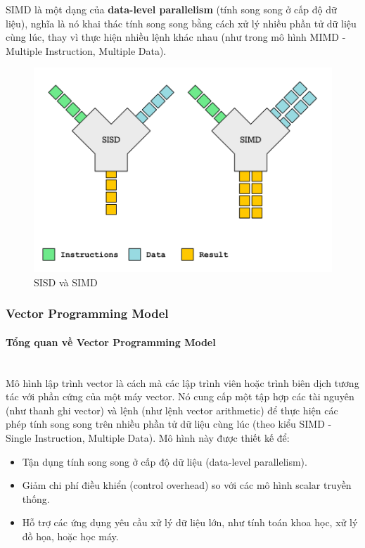 \documentclass[a4paper]{article}
\begin{document}

SIMD là một dạng của \textbf{data-level parallelism} (tính song song ở cấp độ dữ liệu), nghĩa là nó khai thác tính song song bằng cách xử lý nhiều phần tử dữ liệu cùng lúc, thay vì thực hiện nhiều lệnh khác nhau (như trong mô hình MIMD - Multiple Instruction, Multiple Data).
\begin{figure}[H]
     \centering
     \includegraphics[scale=0.3]{assets/simd.png}
     \caption{SISD và SIMD}
     \label{fig:2ss}
 \end{figure}
 
\subsubsection{Vector Programming Model}
\paragraph{Tổng quan về Vector Programming Model} \leavevmode\\

Mô hình lập trình vector là cách mà các lập trình viên hoặc trình biên dịch tương tác với phần cứng của một máy vector. Nó cung cấp một tập hợp các tài nguyên (như thanh ghi vector) và lệnh (như lệnh vector arithmetic) để thực hiện các phép tính song song trên nhiều phần tử dữ liệu cùng lúc (theo kiểu SIMD - Single Instruction, Multiple Data). Mô hình này được thiết kế để:

\begin{itemize}
\item Tận dụng tính song song ở cấp độ dữ liệu (data-level parallelism).
\item Giảm chi phí điều khiển (control overhead) so với các mô hình scalar truyền thống.
\item Hỗ trợ các ứng dụng yêu cầu xử lý dữ liệu lớn, như tính toán khoa học, xử lý đồ họa, hoặc học máy.
\end{itemize}
\end{document}
